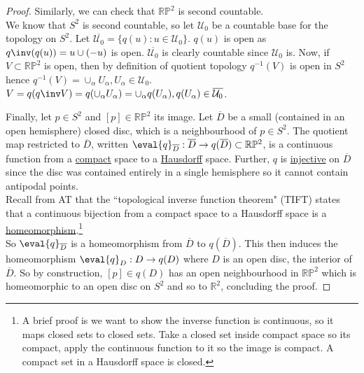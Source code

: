 \begin{example}
\begin{proof}
		Similarly, we can check that $\mathbb R \mathbb P^2$ is second countable. \\
		We know that $S^2$ is second countable, so let $\mathcal U_0$ be a countable base for the topology on $S^2$.
		Let $\overline{\mathcal U_0} = \{q(u) : u \in \mathcal{U}_0\}$.
		$q(u)$ is open as $q\inv(q(u)) = u \cup (-u)$ is open. 
		$\overline{\mathcal U_0}$ is clearly countable since $\mathcal{U}_0$ is.
		Now, if $V \subset \mathbb R \mathbb P^2$ is open, then by definition of quotient topology $q^{-1}(V)$ is open in $S^2$ hence $q^{-1}(V) = \cup_\alpha U_\alpha, U_\alpha \in \mathcal{U}_0$.
		$V = q(q\inv V) = q(\cup_\alpha U_\alpha) = \cup_\alpha q(U_\alpha), q(U_\alpha) \in \overline{\mathcal{U}_0}$.

		Finally, let $p \in S^2$ and $[p] \in \mathbb R \mathbb P^2$ its image.
		Let $\overline D$ be a small (contained in an open hemisphere) closed disc, which is a neighbourhood of $p \in S^2$.
		The quotient map restricted to $\overline D$, written $\eval{q}_{\overline D} : \overline D \to q(\overline D) \subset \mathbb R \mathbb P^2$, is a continuous function from a \underline{compact} space to a \underline{Hausdorff} space.
		Further, $q$ is \underline{injective} on $\overline D$ since the disc was contained entirely in a single hemisphere so it cannot contain antipodal points. \\
		Recall from AT that the ``topological inverse function theorem" (TIFT) states that a continuous bijection from a compact space to a Hausdorff space is a \underline{homeomorphism}.\footnote{A brief proof is we want to show the inverse function is continuous, so it maps closed sets to closed sets. Take a closed set inside compact space so its compact, apply the continuous function to it so the image is compact. A compact set in a Hausdorff space is closed.} \\
		So $\eval{q}_{\overline D}$ is a homeomorphism from $\overline D$ to $q(\overline D)$.
		This then induces the homeomorphism $\eval{q}_{D} : D \to q(D)$ where $D$ is an open disc, the interior of $\overline D$.
		So by construction, $[p] \in q(D)$ has an open neighbourhood in $\mathbb R \mathbb P^2$ which is homeomorphic to an open disc on $S^2$ and so to $\mathbb{R}^2$, concluding the proof.
	\end{proof}
\end{example}
